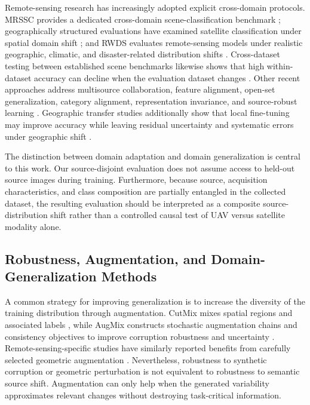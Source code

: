 Remote-sensing research has increasingly adopted explicit cross-domain protocols. MRSSC provides a dedicated cross-domain scene-classification benchmark \cite{liu2022mrssc}; geographically structured evaluations have examined satellite classification under spatial domain shift \cite{alemadi2025dsg}; and RWDS evaluates remote-sensing models under realistic geographic, climatic, and disaster-related distribution shifts \cite{alemadi2025rwds}. Cross-dataset testing between established scene benchmarks likewise shows that high within-dataset accuracy can decline when the evaluation dataset changes \cite{nafiiyah2026convnextcross}. Other recent approaches address multisource collaboration, feature alignment, open-set generalization, category alignment, representation invariance, and source-robust learning \cite{han2024mscdg,zhu2024fcan,zheng2024openset,li2024categoryalign,yang2024geira,kuriyal2025codex,qi2025srdgnet}. Geographic transfer studies additionally show that local fine-tuning may improve accuracy while leaving residual uncertainty and systematic errors under geographic shift \cite{hossain2026trustworthy}.

The distinction between domain adaptation and domain generalization is central to this work. Our source-disjoint evaluation does not assume access to held-out source images during training. Furthermore, because source, acquisition characteristics, and class composition are partially entangled in the collected dataset, the resulting evaluation should be interpreted as a composite source-distribution shift rather than a controlled causal test of UAV versus satellite modality alone.

\subsection{Robustness, Augmentation, and Domain-Generalization Methods}

A common strategy for improving generalization is to increase the diversity of the training distribution through augmentation. CutMix mixes spatial regions and associated labels \cite{yun2019cutmix}, while AugMix constructs stochastic augmentation chains and consistency objectives to improve corruption robustness and uncertainty \cite{hendrycks2020augmix}. Remote-sensing-specific studies have similarly reported benefits from carefully selected geometric augmentation \cite{alharbi2023qss}. Nevertheless, robustness to synthetic corruption or geometric perturbation is not equivalent to robustness to semantic source shift. Augmentation can only help when the generated variability approximates relevant changes without destroying task-critical information.


